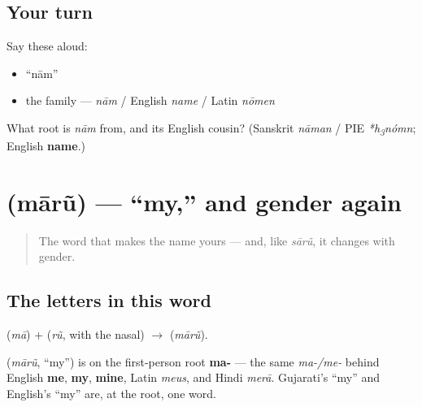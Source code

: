 \subsection*{Your turn}
Say these aloud:

\begin{itemize}
\raggedright
  \item \textquotedblleft{}nām\textquotedblright{}
  \item the family — \emph{nām} / English \emph{name} / Latin \emph{nōmen}
\end{itemize}

\begin{tcolorbox}[breakable,colback=teal!4,colframe=teal!35!black,title={Before you move on}]
What root is \emph{nām} from, and its English cousin? (Sanskrit \emph{nāman} / PIE \emph{*h\textsubscript{3}nómn}; English \textbf{name}.)
\end{tcolorbox}
\section[\texorpdfstring{\gu{મારું} (mārũ)}{મારું (mārũ)}]{ (mārũ) — \textquotedblleft{}my,\textquotedblright{} and gender again}

\label{lesson:GU-C02-maarun}



\begin{quote}
The word that makes the name yours — and, like \emph{sārũ}, it changes with gender.
\end{quote}

\subsection*{The letters in this word}
\textbf{} (\emph{mā}) + \textbf{} (\emph{rũ}, with the nasal) $\to$ \textbf{} (\emph{mārũ}).

\begin{cousinweb}
\textbf{} (\emph{mārũ}, \textquotedblleft{}my\textquotedblright{}) is on the first-person root \textbf{ma-} — the same \emph{ma-/me-} behind English \textbf{me}, \textbf{my}, \textbf{mine}, Latin \emph{meus}, and Hindi \emph{merā}. Gujarati's \textquotedblleft{}my\textquotedblright{} and English's \textquotedblleft{}my\textquotedblright{} are, at the root, one word.
\end{cousinweb}

